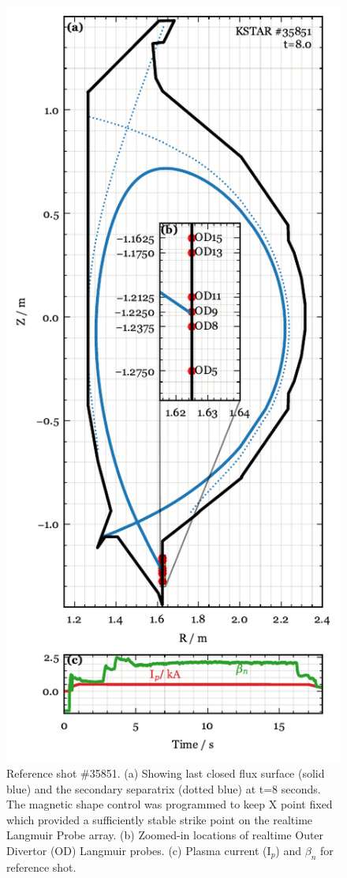 \begin{figure}[!ht]
 \centering
 \includegraphics[width=\linewidth]{figures/RefShot_35851.pdf}
 \caption{
Reference shot \#35851.
(a) Showing last closed flux surface (solid blue) and the secondary separatrix (dotted blue) at t=8 seconds.
The magnetic shape control was programmed to keep X point fixed which provided a sufficiently stable strike point on the realtime Langmuir Probe array.
(b) Zoomed-in locations of realtime Outer Divertor (OD) Langmuir probes.
(c) Plasma current (I$_p$) and $\beta_n$ for reference shot.
}
 \label{fig:ref_shot}
\end{figure}

